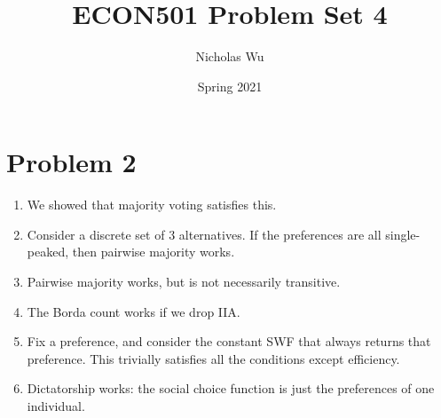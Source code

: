 \documentclass[10pt,letter]{article}
\begin{document}


\title{ECON501 Problem Set 4}

\author{Nicholas Wu}

\date{Spring 2021}

\maketitle

\section*{Problem 2}
\begin{enumerate}[label=(\alph*)]
\item We showed that majority voting satisfies this.
\item Consider a discrete set of 3 alternatives. If the preferences are all single-peaked, then pairwise majority works.
\item Pairwise majority works, but is not necessarily transitive.
\item The Borda count works if we drop IIA.
\item Fix a preference, and consider the constant SWF that always returns that preference. This trivially satisfies all the conditions except efficiency.
\item Dictatorship works: the social choice function is just the preferences of one individual.
\end{enumerate}
\end{document}
